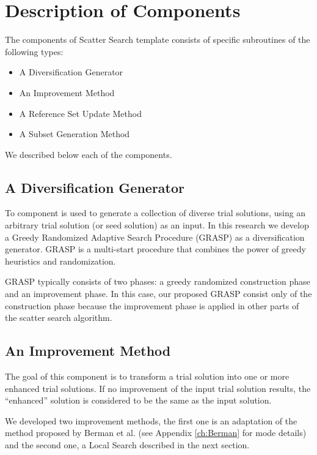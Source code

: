 \section{Description of Components}
The components of Scatter Search template \cite{glover1998template}
consists of
specific subroutines of the following types:
\begin{itemize}
\item A Diversification Generator
\item An Improvement Method
\item A Reference Set Update Method
\item A Subset Generation Method
\end{itemize}
We described below
each of the components.

\subsection{A Diversification Generator}
To component is used to generate
a collection of diverse trial solutions,
using an arbitrary trial solution
(or seed solution) as an input.
%
In this research
we develop a Greedy Randomized Adaptive Search Procedure (GRASP)
as a diversification generator.
GRASP \cite{feo1995greedy}
is a multi-start procedure that combines
the power of greedy heuristics and randomization.

GRASP typically consists of two phases:
a greedy randomized construction phase
and an improvement phase.
In this case,
our proposed GRASP
consist only of the construction phase
because the improvement phase
is applied in other parts
of the scatter search algorithm.


\subsection{An Improvement Method}
The goal of this component
is to transform a trial solution
into one or more enhanced trial solutions. 
If no improvement
of the input trial solution results, 
the ``enhanced'' solution
is considered to be
the same as the input solution.

We developed two improvement methods,
the first one is an adaptation
of the method proposed by Berman et al. \cite{berman1987stochastic}
(see Appendix \ref{ch:Berman} for mode details)
and the second one,
a Local Search
described in the next section.


